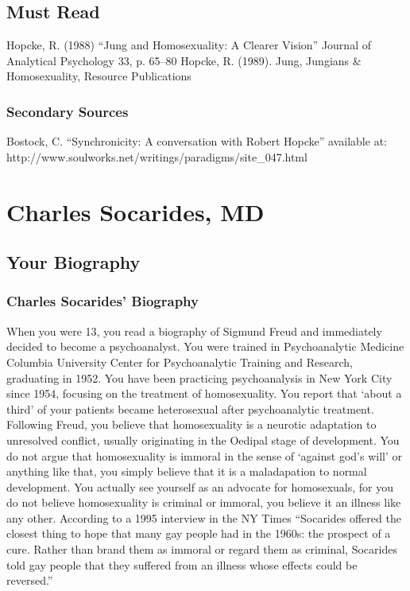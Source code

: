 \section{Must Read}
\label{mustread}

Hopcke, R. (1988) “Jung and Homosexuality: A Clearer Vision” Journal of Analytical Psychology 33, p. 65--80
Hopcke, R. (1989). Jung, Jungians \& Homosexuality, Resource Publications

\subsection{Secondary Sources}
\label{secondarysources}

Bostock, C. “Synchronicity: A conversation with Robert Hopcke” available at: http:\slash \slash www.soulworks.net\slash writings\slash paradigms\slash site\_047.html

\chapter{Charles Socarides, MD}
\label{charlessocaridesmd}

\section{Your Biography}
\label{yourbiography}

\subsection{Charles Socarides' Biography}
\label{charlessocaridesbiography}

When you were 13, you read a biography of Sigmund Freud and immediately decided to become a psychoanalyst. You were trained in Psychoanalytic Medicine Columbia University Center for Psychoanalytic Training and Research, graduating in 1952.
You have been practicing psychoanalysis in New York City since 1954, focusing on the treatment of homosexuality. You report that `about a third' of your patients became heterosexual after psychoanalytic treatment. Following Freud, you believe that homosexuality is a neurotic adaptation to unresolved conflict, usually originating in the Oedipal stage of development. You do not argue that homosexuality is immoral in the sense of `against god's will' or anything like that, you simply believe that it is a maladapation to normal development. You actually see yourself as an advocate for homosexuals, for you do not believe homosexuality is criminal or immoral, you believe it an illness like any other.
According to a 1995 interview in the NY Times “Socarides offered the closest thing to hope that many gay people had in the 1960s: the prospect of a cure. Rather than brand them as immoral or regard them as criminal, Socarides told gay people that they suffered from an illness whose effects could be reversed.”


